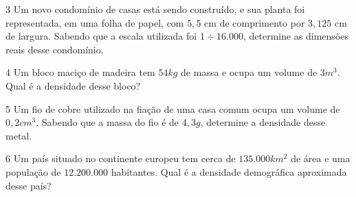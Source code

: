 \bigskip




\bigskip

\num{3} Um novo condomínio de casas está sendo construído, e sua planta foi
representada, em uma folha de papel, com $5,5$ cm de comprimento por $3,125$
cm de largura. Sabendo que a escala utilizada foi $1 \div 16.000$, determine
as dimensões reais desse condomínio.

\bigskip





\bigskip

\num{4} Um bloco maciço de madeira tem $54 kg$ de massa e ocupa um volume de $3
m^3$. Qual é a densidade desse bloco?

\bigskip





\bigskip

\num{5} Um fio de cobre utilizado na fiação de uma casa comum ocupa um volume
de $0,2 cm^3$. Sabendo que a massa do fio é de $4,3 g$, determine a densidade
desse metal.




\pagebreak

\num{6} Um país situado no continente europeu tem cerca de $135.000 km^2$ de
área e uma população de $12.200.000$ habitantes. Qual é a densidade
demográfica aproximada desse país?

\bigskip



